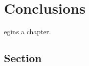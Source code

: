 \let\textcircled=\pgftextcircled
\chapter{Conclusions}
\label{chap:conclusions}

egins a chapter. 

\section{Section}
\label{sec:conc}

